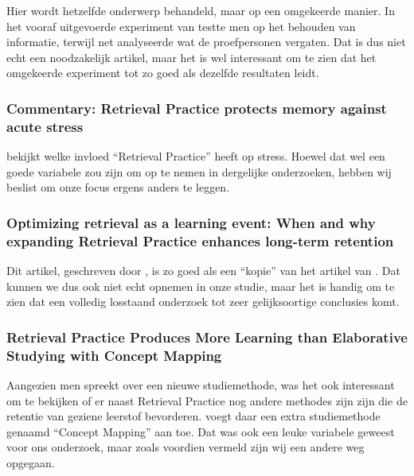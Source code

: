 \documentclass{hogent-article}
\begin{document}
Hier wordt hetzelfde onderwerp behandeld, maar op een omgekeerde manier. In het vooraf uitgevoerde experiment van \textcite{Roediger_2006} testte men op het behouden van informatie, terwijl \textcite{Storm_2010} net analyseerde wat de proefpersonen vergaten. Dat is dus niet echt een noodzakelijk artikel, maar het is wel interessant om te zien dat het omgekeerde experiment tot zo goed als dezelfde resultaten leidt.

\subsubsection{Commentary: Retrieval Practice protects memory against acute stress}

\textcite{Smith_2016} bekijkt welke invloed ``Retrieval Practice'' heeft op stress. Hoewel dat wel een goede variabele zou zijn om op te nemen in dergelijke onderzoeken, hebben wij beslist om onze focus ergens anders te leggen.

\subsubsection{Optimizing retrieval as a learning event: When and why expanding Retrieval Practice enhances long-term retention}

Dit artikel, geschreven door \textcite{Storm_2010}, is zo goed als een ``kopie'' van het artikel van \textcite{Roediger_2006}. Dat kunnen we dus ook niet echt opnemen in onze studie, maar het is handig om te zien dat een volledig losstaand onderzoek tot zeer gelijksoortige conclusies komt. 

\subsubsection{Retrieval Practice Produces More Learning than Elaborative Studying with Concept Mapping}

Aangezien men spreekt over een nieuwe studiemethode, was het ook interessant om te bekijken of er naast Retrieval Practice nog andere methodes zijn zijn die de retentie van geziene leerstof bevorderen. \textcite{Karpicke_2011} voegt daar een extra studiemethode genaamd ``Concept Mapping'' aan toe. Dat was ook een leuke variabele geweest voor ons onderzoek, maar zoals voordien vermeld zijn wij een andere weg opgegaan.


\printbibliography[heading=bibintoc]
\end{document}
